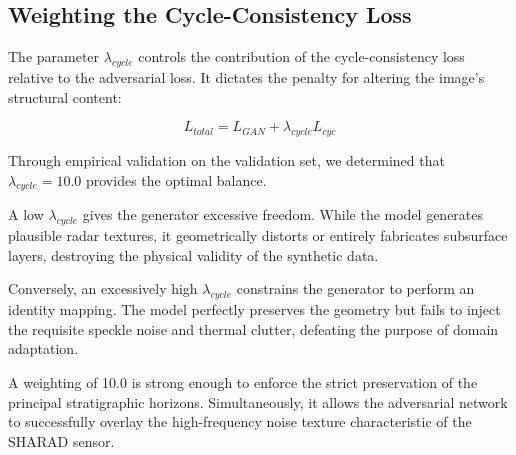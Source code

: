 \subsection{Weighting the Cycle-Consistency Loss}
The parameter $\lambda_{cycle}$ controls the contribution of the cycle-consistency loss relative to the adversarial loss.
It dictates the penalty for altering the image's structural content:

$$L_{total}=L_{GAN}+\lambda_{cycle}L_{cyc}$$

Through empirical validation on the validation set, we determined that $\lambda_{cycle}=10.0$ provides the optimal balance. 

A low $\lambda_{cycle}$ gives the generator excessive freedom.
While the model generates plausible radar textures, it geometrically distorts or entirely fabricates subsurface layers, destroying the physical validity of the synthetic data.

Conversely, an excessively high $\lambda_{cycle}$ constrains the generator to perform an identity mapping.
The model perfectly preserves the geometry but fails to inject the requisite speckle noise and thermal clutter, defeating the purpose of domain adaptation.

A weighting of 10.0 is strong enough to enforce the strict preservation of the principal stratigraphic horizons.
Simultaneously, it allows the adversarial network to successfully overlay the high-frequency noise texture characteristic of the SHARAD sensor.

